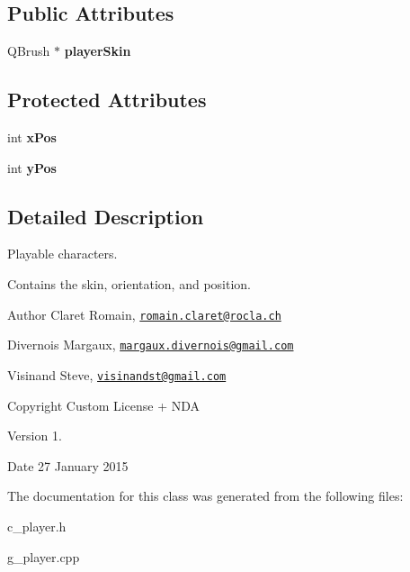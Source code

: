 \subsection*{Public Attributes}
\begin{DoxyCompactItemize}
\item 
\hypertarget{class_c___player_ab3777f3a3c6f44748fd4f0687f32aa3c}{}Q\+Brush $\ast$ {\bfseries player\+Skin}\label{class_c___player_ab3777f3a3c6f44748fd4f0687f32aa3c}

\end{DoxyCompactItemize}
\subsection*{Protected Attributes}
\begin{DoxyCompactItemize}
\item 
\hypertarget{class_c___player_a2307a5ffc4d20962d4721976b197d173}{}int {\bfseries x\+Pos}\label{class_c___player_a2307a5ffc4d20962d4721976b197d173}

\item 
\hypertarget{class_c___player_a3da14c9af55d4c8e7cd2fb44498fd5f0}{}int {\bfseries y\+Pos}\label{class_c___player_a3da14c9af55d4c8e7cd2fb44498fd5f0}

\end{DoxyCompactItemize}


\subsection{Detailed Description}
Playable characters. 

Contains the skin, orientation, and position. \begin{DoxyAuthor}{Author}
Claret Romain, \href{mailto:romain.claret@rocla.ch}{\tt romain.\+claret@rocla.\+ch} 

Divernois Margaux, \href{mailto:margaux.divernois@gmail.com}{\tt margaux.\+divernois@gmail.\+com} 

Visinand Steve, \href{mailto:visinandst@gmail.com}{\tt visinandst@gmail.\+com} 
\end{DoxyAuthor}
\begin{DoxyCopyright}{Copyright}
Custom License + N\+D\+A 
\end{DoxyCopyright}
\begin{DoxyVersion}{Version}
1. 
\end{DoxyVersion}
\begin{DoxyDate}{Date}
27 January 2015 
\end{DoxyDate}


The documentation for this class was generated from the following files\+:\begin{DoxyCompactItemize}
\item 
c\+\_\+player.\+h\item 
g\+\_\+player.\+cpp\end{DoxyCompactItemize}
